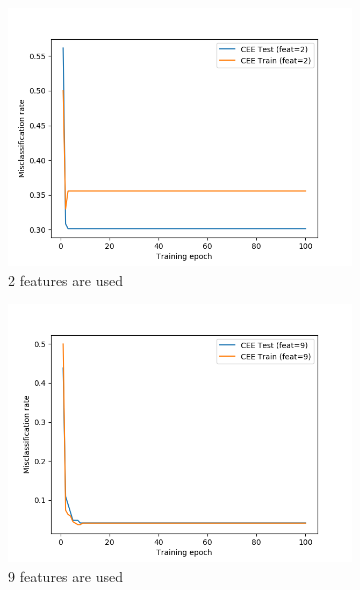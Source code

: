 \documentclass[a4paper,11pt]{article}
\begin{document}
\begin{figure}
	\centering
	\begin{subfigure}[b]{0.49\textwidth}
		\centering
		\includegraphics[width=\textwidth]{images/irls_mcr-2.png}
		\caption{2 features are used}
		\label{irls:mcr_2}
	\end{subfigure}
	\begin{subfigure}[b]{0.49\textwidth}
		\centering
		\includegraphics[width=\textwidth]{images/irls_mcr-9.png}
		\caption{9 features are used}
		\label{irls:mcr_9}
	\end{subfigure}
	\begin{subfigure}[b]{0.49\textwidth}
		\centering

\end{subfigure}
\end{figure}
\end{document}
